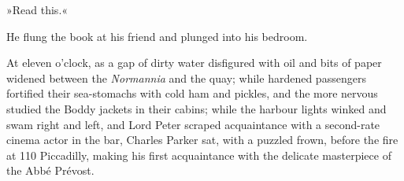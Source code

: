 »Read this.«

He flung the book at his friend and plunged into his bedroom.

At eleven o'clock, as a gap of dirty water disfigured with oil and bits of paper widened between the \textit{Normannia} and the quay; while hardened passengers fortified their sea-stomachs with cold ham and pickles, and the more nervous studied the Boddy jackets in their cabins; while the harbour lights winked and swam right and left, and Lord Peter scraped acquaintance with a second-rate cinema actor in the bar, Charles Parker sat, with a puzzled frown, before the fire at 110 Piccadilly, making his first acquaintance with the delicate masterpiece of the Abbé Prévost.

